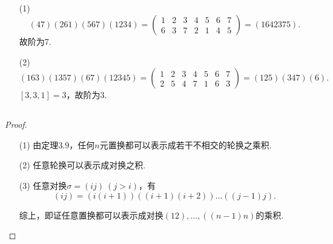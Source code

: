 \documentclass[UTF8]{ctexart}
\begin{document}
\subsection{}   %
\begin{enumerate}
    \item [(1)]
    \[
        (47)(261)(567)(1234)
        =
        \begin{pmatrix}
            1 & 2 & 3 & 4 & 5 & 6 & 7\\
            6 & 3 & 7 & 2 & 1 & 4 & 5
        \end{pmatrix}   
        =
        (1642375). 
    \]
    故阶为7.
    \item [(2)]
    \[
        (163) (1357) (67) (12345)   
        =
        \begin{pmatrix}
            1 & 2 & 3 & 4 & 5 & 6 & 7\\
            2 & 5 & 4 & 7 & 1 & 6 & 3
        \end{pmatrix}
        =
        (125)(347)(6). 
    \]
    $[3,3,1]=3$，故阶为3.
\end{enumerate}

\subsection{}   %
\begin{proof}
    \begin{enumerate}
        \item []
        \item [(1)]由定理$3.9$，任何$n$元置换都可以表示成若干不相交的轮换之乘积.
        \item [(2)]任意轮换可以表示成对换之积.
        \item [(3)]任意对换$\sigma=(ij)\ (j>i)$，有
        \[
            (ij)= (i (i+1)) ((i+1)(i+2))\ldots ((j-1)j).
        \]
        \item []综上，即证任意置换都可以表示成对换$(12),\ldots,((n-1)n)$的乘积.
    \end{enumerate}
\end{proof}
\end{document}
